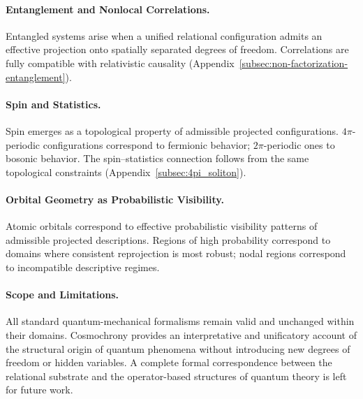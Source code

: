   \paragraph{Entanglement and Nonlocal Correlations.}
    \label{subsec:entanglement-nonlocality}
    Entangled systems arise when a unified relational configuration admits an
    effective projection onto spatially separated degrees of freedom.
    Correlations are fully compatible with relativistic causality
    (Appendix~\ref{subsec:non-factorization-entanglement}).

  \paragraph{Spin and Statistics.}
    \label{subsec:spin-statistics}
    Spin emerges as a topological property of admissible projected
    configurations.
    $4\pi$-periodic configurations correspond to fermionic behavior;
    $2\pi$-periodic ones to bosonic behavior.
    The spin--statistics connection follows from the same topological
    constraints
    (Appendix~\ref{subsec:4pi_soliton}).

  \paragraph{Orbital Geometry as Probabilistic Visibility.}
    \label{sec:orbital_geometry_visibility}
    Atomic orbitals correspond to effective probabilistic visibility patterns
    of admissible projected descriptions.
    Regions of high probability correspond to domains where consistent
    reprojection is most robust; nodal regions correspond to incompatible
    descriptive regimes.

  \paragraph{Scope and Limitations.}
    \label{subsec:scope-and-limitations}
    All standard quantum-mechanical formalisms remain valid and unchanged
    within their domains.
    Cosmochrony provides an interpretative and unificatory account of the
    structural origin of quantum phenomena without introducing new degrees of
    freedom or hidden variables.
    A complete formal correspondence between the relational substrate and the
    operator-based structures of quantum theory is left for future work.
